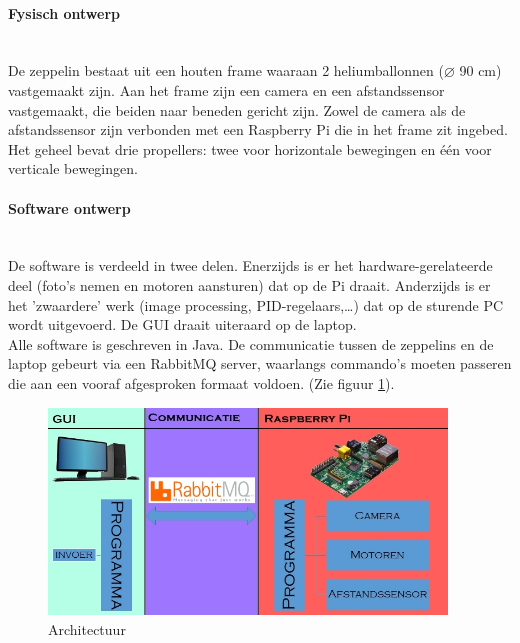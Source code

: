 \documentclass[eind]{penoverslag}
\begin{document}
\paragraph{Fysisch ontwerp}
~\\
De zeppelin bestaat uit een houten frame waaraan 2 heliumballonnen ($\diameter$ 90 cm) vastgemaakt zijn. Aan het frame zijn een camera en een afstandssensor vastgemaakt, die beiden naar beneden gericht zijn. Zowel de camera als de afstandssensor zijn verbonden met een Raspberry Pi die in het frame zit ingebed. Het geheel bevat drie propellers: twee voor horizontale bewegingen en \'{e}\'{e}n voor verticale bewegingen.


\paragraph{Software ontwerp}
~\\
De software is verdeeld in twee delen. Enerzijds is er het hardware-gerelateerde deel (foto's nemen en motoren aansturen) dat op de Pi draait. Anderzijds is er het 'zwaardere' werk (image processing, PID-regelaars,\ldots) dat op de sturende PC wordt uitgevoerd. De GUI draait uiteraard op de laptop. \\
Alle software is geschreven in Java. De communicatie tussen de zeppelins en de laptop gebeurt via een RabbitMQ server, waarlangs commando's moeten passeren die aan een vooraf afgesproken formaat voldoen. (Zie figuur \ref{schema}). \\

\begin{figure}[ht!]
\centering
\includegraphics[height=55mm]{Schema.jpg}
\caption{Architectuur}
\label{schema}
\end{figure}

\end{document}
